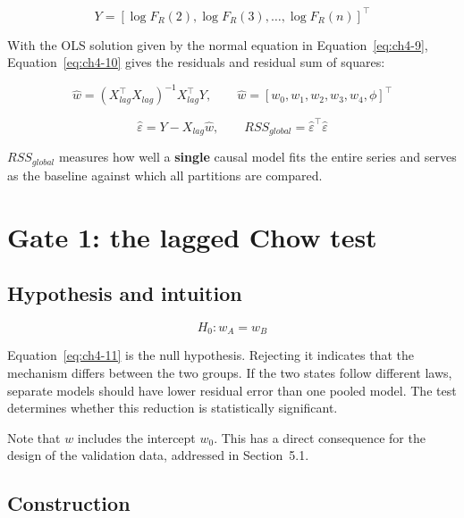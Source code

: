 \begin{equation}
    \label{eq:ch4-8}
Y = [\log F_R(2), \log F_R(3), \ldots, \log F_R(n)]^\top
\end{equation}

With the OLS solution given by the normal equation in Equation~\eqref{eq:ch4-9},
Equation~\eqref{eq:ch4-10} gives the residuals and residual sum of squares:

\begin{equation}
    \label{eq:ch4-9}
\hat{w} = (X_{lag}^\top X_{lag})^{-1} X_{lag}^\top Y, \qquad \hat{w} = [w_0, w_1, w_2, w_3, w_4, \phi]^\top
\end{equation}

\begin{equation}
    \label{eq:ch4-10}
\hat{\varepsilon} = Y - X_{lag}\hat{w}, \qquad RSS_{global} = \hat{\varepsilon}^\top \hat{\varepsilon}
\end{equation}

$RSS_{global}$ measures how well a \textbf{single} causal model fits the entire series and
serves as the baseline against which all partitions are compared.


\section{Gate 1: the lagged Chow test}


\subsection{Hypothesis and intuition}

\begin{equation}
    \label{eq:ch4-11}
H_0 : w_A = w_B
\end{equation}

Equation~\eqref{eq:ch4-11} is the null hypothesis. Rejecting it indicates that the
mechanism differs between the two groups. If the two states follow different laws,
separate models should have lower residual error than one pooled model. The test
determines whether this reduction is statistically significant.

Note that $w$ includes the intercept $w_0$. This has a direct consequence for the
design of the validation data, addressed in Section~5.1.


\subsection{Construction}

